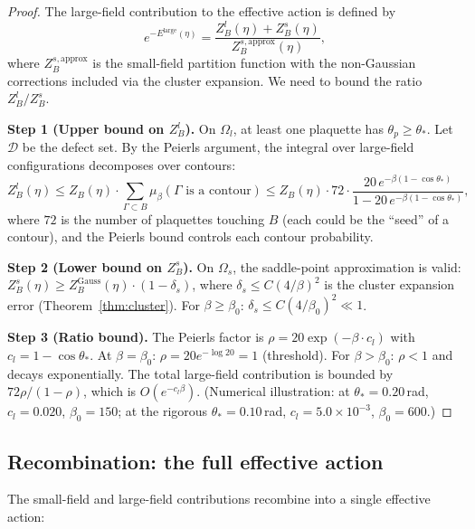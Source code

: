 \documentclass[11pt]{article}
\theoremstyle{definition}
\begin{document}
\begin{proof}
The large-field contribution to the effective action is defined by
\begin{equation}
e^{-E^{\mathrm{large}}(\eta)}
=\frac{Z_B^l(\eta)+Z_B^s(\eta)}{Z_B^{s,\mathrm{approx}}(\eta)},
\end{equation}
where $Z_B^{s,\mathrm{approx}}$ is the small-field partition function
with the non-Gaussian corrections included via the cluster expansion.
We need to bound the ratio $Z_B^l/Z_B^s$.

\textbf{Step 1 (Upper bound on $Z_B^l$).}
On $\Omega_l$, at least one plaquette has $\theta_p\ge\theta_*$.
Let $\mathcal{D}$ be the defect set.  By the Peierls argument, the
integral over large-field configurations decomposes over contours:
\begin{equation}
Z_B^l(\eta)\le Z_B(\eta)\cdot\sum_{\Gamma\subset B}
\mu_\beta(\Gamma\text{ is a contour})
\le Z_B(\eta)\cdot 72\cdot\frac{20\,e^{-\beta(1-\cos\theta_*)}}
{1-20\,e^{-\beta(1-\cos\theta_*)}},
\end{equation}
where $72$ is the number of plaquettes touching $B$ (each could
be the ``seed'' of a contour), and the Peierls bound controls each
contour probability.

\textbf{Step 2 (Lower bound on $Z_B^s$).}
On $\Omega_s$, the saddle-point approximation is valid:
$Z_B^s(\eta)\ge Z_B^{\mathrm{Gauss}}(\eta)\cdot(1-\delta_s)$,
where $\delta_s\le C(4/\beta)^2$ is the cluster expansion error
(Theorem~\ref{thm:cluster}).  For $\beta\ge\beta_0$:
$\delta_s\le C(4/\beta_0)^2\ll 1$.

\textbf{Step 3 (Ratio bound).}
The Peierls factor is
$\rho=20\exp(-\beta\cdot c_l)$ with $c_l=1-\cos\theta_*$.
At $\beta=\beta_0$: $\rho=20e^{-\log 20}=1$ (threshold).
For $\beta>\beta_0$: $\rho<1$ and decays exponentially.
The total large-field
contribution is bounded by $72\rho/(1-\rho)$, which is $O(e^{-c_l\beta})$.
(Numerical illustration: at $\theta_*=0.20$\,rad, $c_l=0.020$,
$\beta_0=150$; at the rigorous $\theta_*=0.10$\,rad,
$c_l=5.0\times 10^{-3}$, $\beta_0=600$.)
\end{proof}

\subsection{Recombination: the full effective action}
\label{subsec:recombine}

The small-field and large-field contributions recombine into a single
effective action:
\end{document}
